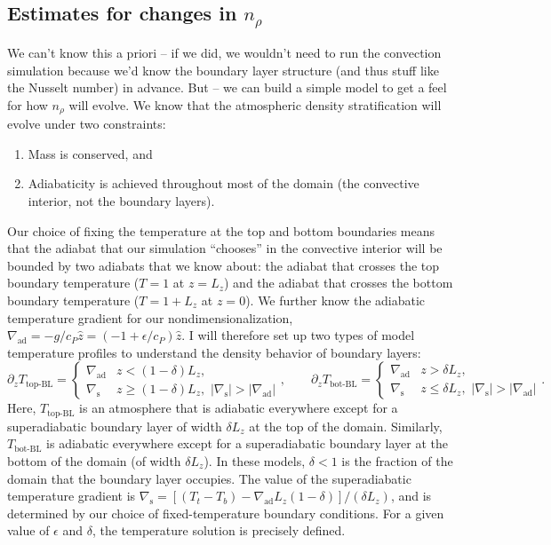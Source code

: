 \documentclass[aps, pre, onecolumn, nofootinbib, notitlepage, groupedaddress, amsfonts, amssymb, amsmath, longbibliography, superscriptaddress]{revtex4-1}
\newcommand{\grad}{\ensuremath{\nabla}}
\begin{document}
\subsection{Estimates for changes in $n_\rho$}
We can't know this a priori -- if we did, we wouldn't need to run the convection simulation because we'd know the boundary layer structure (and thus stuff like the Nusselt number) in advance.
But -- we can build a simple model to get a feel for how $n_\rho$ will evolve.
We know that the atmospheric density stratification will evolve under two constraints:
\begin{enumerate}
\item Mass is conserved, and
\item Adiabaticity is achieved throughout most of the domain (the convective interior, not the boundary layers).
\end{enumerate}
Our choice of fixing the temperature at the top and bottom boundaries means that the adiabat that our simulation ``chooses'' in the convective interior will be bounded by two adiabats that we know about: the adiabat that crosses the top boundary temperature ($T = 1$ at $z = L_z$) and the adiabat that crosses the bottom boundary temperature ($T = 1 + L_z$ at $z = 0$).
We further know the adiabatic temperature gradient for our nondimensionalization, $\grad_{\text{ad}} = -g / c_P \hat{z} = (-1 + \epsilon/c_P)\hat{z}$.
I will therefore set up two types of model temperature profiles to understand the density behavior of boundary layers:
\begin{equation}
\partial_z T_{\text{top-BL}} = \begin{cases}
\grad_{\text{ad}} & z < (1-\delta) L_z, \\
\grad_{\text{s}}  & z \geq (1-\delta) L_z, \,\, |\grad_{\text{s}}| > |\grad_{\text{ad}}|
\end{cases},\qquad
\partial_z T_{\text{bot-BL}} = \begin{cases}
\grad_{\text{ad}} & z > \delta L_z, \\
\grad_{\text{s}}  & z \leq \delta L_z, \,\, |\grad_{\text{s}}| > |\grad_{\text{ad}}|
\end{cases}.
\end{equation}
Here, $T_{\text{top-BL}}$ is an atmosphere that is adiabatic everywhere except for a superadiabatic boundary layer of width $\delta L_z$ at the top of the domain.
Similarly, $T_{\text{bot-BL}}$ is adiabatic everywhere except for a superadiabatic boundary layer at the bottom of the domain (of width $\delta L_z$).
In these models, $\delta < 1$ is the fraction of the domain that the boundary layer occupies.
The value of the superadiabatic temperature gradient is $\grad_{\text{s}} = [(T_t - T_b) - \grad_{\text{ad}} L_z (1 - \delta)] / (\delta L_z)$, and is determined by our choice of fixed-temperature boundary conditions.
For a given value of $\epsilon$ and $\delta$, the temperature solution is precisely defined.
\end{document}
